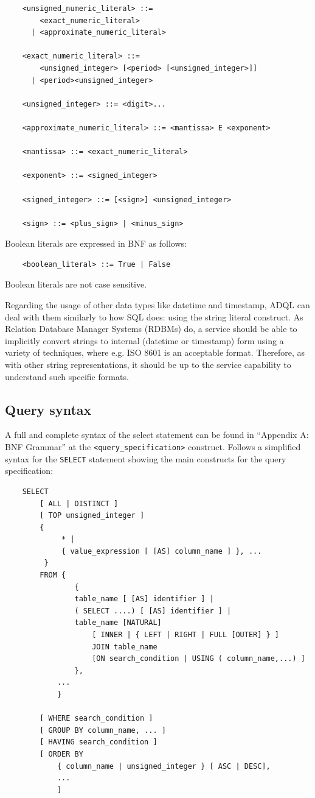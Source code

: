 \documentclass[11pt,a4paper]{ivoa}
\begin{document}
\begin{verbatim}
    <unsigned_numeric_literal> ::=
        <exact_numeric_literal>
      | <approximate_numeric_literal>

    <exact_numeric_literal> ::=
        <unsigned_integer> [<period> [<unsigned_integer>]]
      | <period><unsigned_integer>

    <unsigned_integer> ::= <digit>...

    <approximate_numeric_literal> ::= <mantissa> E <exponent>

    <mantissa> ::= <exact_numeric_literal>

    <exponent> ::= <signed_integer>

    <signed_integer> ::= [<sign>] <unsigned_integer>

    <sign> ::= <plus_sign> | <minus_sign>
\end{verbatim}

Boolean literals are expressed in BNF as follows:

\begin{verbatim}
    <boolean_literal> ::= True | False
\end{verbatim}

Boolean literals are not case sensitive.

Regarding the usage of other data types like datetime and timestamp, ADQL
can deal with them similarly to how SQL does: using the string literal
construct. As Relation Database Manager Systems (RDBMs) do, a service should
be able to implicitly convert strings to internal (datetime or timestamp)
form using a variety of techniques, where e.g. ISO 8601 is an acceptable
format. Therefore, as with other string representations, it should be up to
the service capability to understand such specific formats.

\clearpage
\subsection{Query syntax}
\label{sec:syntax}

A full and complete syntax of the select statement can be found in “Appendix
A: BNF Grammar” at the \verb:<query_specification>: construct. Follows a simplified
syntax for the \verb:SELECT: statement showing the main constructs for the query
specification:

\begin{verbatim}
    SELECT
        [ ALL | DISTINCT ]
        [ TOP unsigned_integer ]
        {
             * |
             { value_expression [ [AS] column_name ] }, ...
         }
        FROM {
                {
                table_name [ [AS] identifier ] |
                ( SELECT ....) [ [AS] identifier ] |
                table_name [NATURAL]
                    [ INNER | { LEFT | RIGHT | FULL [OUTER] } ]
                    JOIN table_name
                    [ON search_condition | USING ( column_name,...) ]
                },
            ...
            }

        [ WHERE search_condition ]
        [ GROUP BY column_name, ... ]
        [ HAVING search_condition ]
        [ ORDER BY
            { column_name | unsigned_integer } [ ASC | DESC],
            ...
            ]
\end{verbatim}
\end{document}
